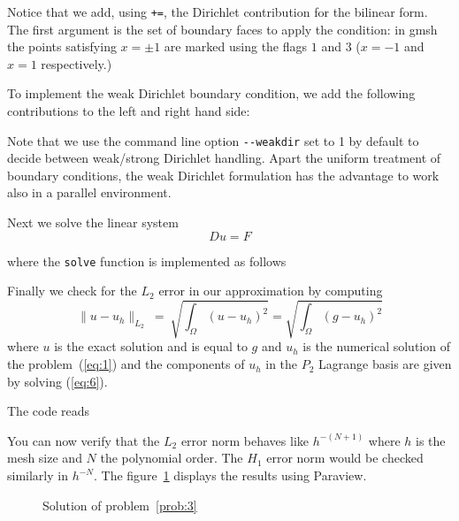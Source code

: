 

Notice that we add, using \lstinline!+=!, the Dirichlet contribution
for the bilinear form. The first argument is the set of boundary faces
to apply the condition: in gmsh the points satisfying $x=\pm 1$ are
marked using the flags $1$ and $3$ ($x=-1$ and $x=1$ respectively.)

To implement the weak Dirichlet boundary condition, we add the
following contributions to the left and right hand side:




Note that we use the command line option \lstinline!--weakdir! set to
1 by default to decide between weak/strong Dirichlet handling.  Apart
the uniform treatment of boundary conditions, the weak Dirichlet
formulation has the advantage to work also in a parallel environment.

Next we solve the linear system
\begin{equation}
  \label{eq:6}
  D u = F
\end{equation}

where the \lstinline!solve! function is implemented as follows



Finally we check for the $L_2$ error in our approximation by computing
\begin{equation}
  \label{eq:7}
  \|u-u_h\|_{L_2}\ =\ \sqrt{\int_\Omega (u-u_h)^2} = \sqrt{\int_\Omega (g-u_h)^2}
\end{equation}
where $u$ is the exact solution and is equal to $g$ and $u_h$ is the
numerical solution of the problem~(\ref{eq:1}) and the components of
$u_h$ in the $P_2$ Lagrange basis are given by solving (\ref{eq:6}).

The code reads




You can now verify that the $L_2$ error norm behaves like $h^{-(N+1)}$
where $h$ is the mesh size and $N$ the polynomial order. The $H_1$
error norm would be checked similarly in $h^{-N}$. The
figure~\ref{fig:2} displays the results using Paraview.

\begin{figure}[htbp]
  \centering
  \caption{Solution of problem~\ref{prob:3}}
  \label{fig:2}
\end{figure}

